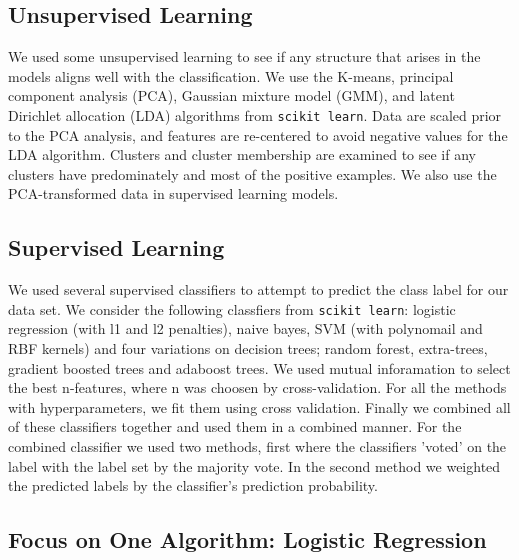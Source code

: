 \subsection{Unsupervised Learning}
We used some unsupervised learning to see if any structure that arises in the models aligns well with the classification.  We use the K-means, principal component analysis (PCA), Gaussian mixture model (GMM), and latent Dirichlet allocation (LDA) algorithms from \texttt{scikit learn}\cite{scikit-learn}.  Data are scaled prior to the PCA analysis, and features are re-centered to avoid negative values for the LDA algorithm.  Clusters and cluster membership are examined to see if any clusters have predominately and most of the positive examples. We also use the PCA-transformed data in supervised learning models.




\subsection{Supervised Learning}
We used several supervised classifiers to attempt to predict the class label for our data set. We consider the following classfiers from \texttt{scikit learn}\cite{scikit-learn}: logistic regression (with l1 and l2 penalties), naive bayes, SVM (with polynomail and RBF kernels) and four variations on decision trees; random forest, extra-trees, gradient boosted trees and adaboost trees. We used mutual inforamation to select the best n-features, where n was choosen by cross-validation. For all the methods with hyperparameters, we fit them using cross validation. Finally we combined all of these classifiers together and used them in a combined manner. For the combined classifier we used two methods, first where the classifiers 'voted' on the label with the label set by the majority vote. In the second method we weighted the predicted labels by the classifier's prediction probability.





\subsection{Focus on One Algorithm: Logistic Regression}

